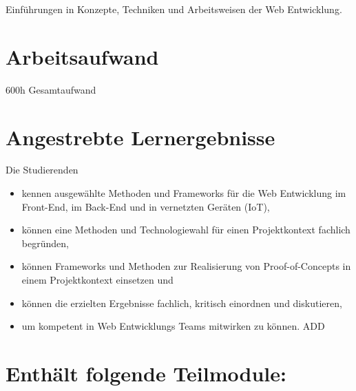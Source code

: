 Einführungen in Konzepte, Techniken und Arbeitsweisen der Web
Entwicklung.

\hypertarget{arbeitsaufwandpathlabelmi-2017modulbeschreibungen-bachelorba_vertiefung-web_development}{%
\section*{Arbeitsaufwand\label{/mi-2017/modulbeschreibungen-bachelor/BA_Vertiefung-Web_Development}}\label{arbeitsaufwandpathlabelmi-2017modulbeschreibungen-bachelorba_vertiefung-web_development}}

600h Gesamtaufwand

\hypertarget{angestrebte-lernergebnissepathlabelmi-2017modulbeschreibungen-bachelorba_vertiefung-web_development}{%
\section*{Angestrebte
Lernergebnisse\label{/mi-2017/modulbeschreibungen-bachelor/BA_Vertiefung-Web_Development}}\label{angestrebte-lernergebnissepathlabelmi-2017modulbeschreibungen-bachelorba_vertiefung-web_development}}

Die Studierenden

\begin{itemize}
\tightlist
\item
  kennen ausgewählte Methoden und Frameworks für die Web Entwicklung im
  Front-End, im Back-End und in vernetzten Geräten (IoT),
\item
  können eine Methoden und Technologiewahl für einen Projektkontext
  fachlich begründen,
\item
  können Frameworks und Methoden zur Realisierung von Proof-of-Concepts
  in einem Projektkontext einsetzen und
\item
  können die erzielten Ergebnisse fachlich, kritisch einordnen und
  diskutieren,
\item
  um kompetent in Web Entwicklungs Teams mitwirken zu können. ADD
\end{itemize}

\hypertarget{enthuxe4lt-folgende-teilmodulepathlabelmi-2017modulbeschreibungen-bachelorba_vertiefung-web_development}{%
\section*{Enthält folgende
Teilmodule:\label{/mi-2017/modulbeschreibungen-bachelor/BA_Vertiefung-Web_Development}}\label{enthuxe4lt-folgende-teilmodulepathlabelmi-2017modulbeschreibungen-bachelorba_vertiefung-web_development}}


